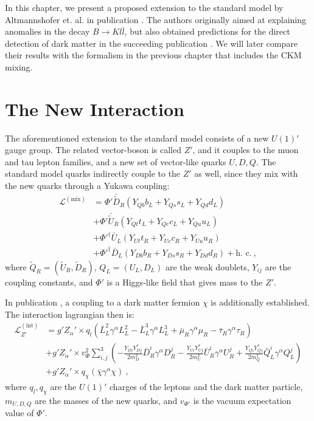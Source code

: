 In this chapter, we present a proposed extension to the standard model by Altmannshofer et. al. in publication \cite{InColour}. The authors originally aimed at explaining anomalies in the decay $B\rightarrow Kl\bar{l}$, but also obtained predictions for the direct detection of dark matter in the succeeding publication \cite{Z}. We will later compare their results with the formalism in the previous chapter that includes the CKM mixing.

\section{The New Interaction}
The aforementioned extension to the standard model consists of a new $U(1)'$ gauge group. The related vector-boson is called $Z'$, and it couples to the muon and tau lepton families, and a new set of vector-like quarks $U,D,Q$. The standard model quarks indirectly couple to the $Z'$ as well, since they mix with the new quarks through a Yukawa coupling:
\begin{align*}
	\mathcal{L}^{(\text{mix})} &= \Phi' \bar{\tilde{D}}_R(Y_{Qb}b_L + Y_{Qs}s_L + Y_{Qd}d_L) \\
	&+ \Phi'\bar{\tilde{U}}_R(Y_{Qt}t_L + Y_{Qc}c_L + Y_{Qu}u_L) \\
	&+ \Phi'^\dagger\bar{U}_L(Y_{Ut}t_R + Y_{Uc}c_R + Y_{Uu}u_R) \\
	&+ \Phi'^\dagger\bar{D}_L(Y_{Db}b_R + Y_{Ds}s_R + Y_{Dd}d_R) +\text{h. c.} \ ,
\end{align*}
where $\tilde{Q}_R = (\tilde{U}_R,\tilde{D}_R)$, $Q_L = (U_L,D_L)$ are the weak doublets, $Y_{ij}$ are the coupling constants, and $\Phi'$ is a Higgs-like field that gives mass to the $Z'$.


In publication \cite{Z}, a coupling to a dark matter fermion $\chi$ is additionally established. The interaction lagrangian then is:
\begin{align*}
	\mathcal{L}^{(\text{int})}_{Z'} &= g'Z_\alpha'\times q_l\left(\bar{L}_L^2\gamma^\alpha L_L^2 - \bar{L}_L^3\gamma^\alpha L_L^3 + \bar{\mu}_R\gamma^\alpha\mu_R-\bar{\tau}_R\gamma^\alpha\tau_R\right) \\
	&+ g'Z_\alpha'\times v_\Phi^2\sum_{i,j}^3\left(-\frac{Y_{Di}Y^*_{Dj}}{2m_D^2}\bar{D}_R^i\gamma^\alpha D_R^j - \frac{Y_{Ui}Y^*_{Uj}}{2m_U^2}\bar{U}_R^i\gamma^\alpha U_R^j + \frac{Y_{Qi}Y_{Qj}^*}{2m_Q^2}\bar{Q}_L^i\gamma^\alpha Q_L^j\right) \\
	&+ g'Z_\alpha'\times q_\chi(\bar{\chi}\gamma^\alpha\chi) \ ,
\end{align*}
where $q_l,q_\chi$ are the $U(1)'$ charges of the leptons and the dark matter particle, $m_{U,D,Q}$ are the masses of the new quarks, and $v_{\Phi'}$ is the vacuum expectation value of $\Phi'$.


